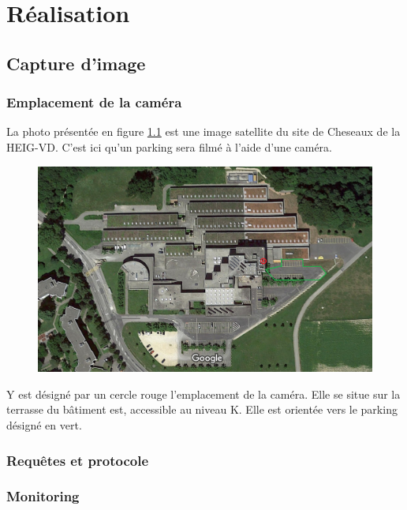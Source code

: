 \chapter{Réalisation}\label{realisation}


\section{Capture d'image}\label{realisation.capture}
\subsection{Emplacement de la caméra}
La photo présentée en figure \ref{fig:cam_parking_annotation} est une image satellite du site de Cheseaux de la HEIG-VD. C'est ici qu'un parking sera filmé à l'aide d'une caméra.

\begin{figure}[H]
    \includegraphics[width=130mm]{img/conception/cam_parking_location.png}
    \label{fig:cam_parking_annotation}
    \centering
\end{figure} 

Y est désigné par un cercle rouge l'emplacement de la caméra. Elle se situe sur la terrasse du bâtiment est, accessible au niveau K. Elle est orientée vers le parking désigné en vert. 

\subsection{Requêtes et protocole}

\subsection{Monitoring}

